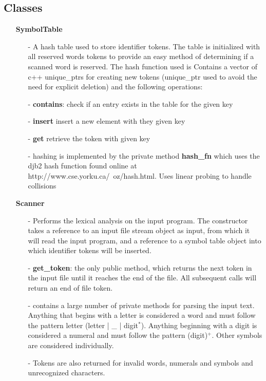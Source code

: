 \documentclass{article}
\begin{document}
\subsection*{Classes}

    \begin{itemize}
        \item[]\textbf{SymbolTable} 
            \begin{itemize}
                \item[-] A hash table used to store identifier tokens. The table is initialized with all reserved words tokens to provide an easy method of determining if a scanned word is reserved. The hash function used is  Contains a vector of c++ unique\_ptrs for creating new tokens (unique\_ptr used to avoid the need for explicit deletion) and the following operations:
                \item[-] \textbf{contains}: check if an entry exists in the table for the given key
                \item[-] \textbf{insert} insert a new element with they given key
                \item[-] \textbf{get} retrieve the token with given key
                \item[-] hashing is implemented by the private method \textbf{hash\_fn} which uses the djb2 hash function found online at http://www.cse.yorku.ca/~oz/hash.html. Uses linear probing to handle collisions
            \end{itemize}

        \item[]\textbf{Scanner}
            \begin{itemize}
                \item[-] Performs the lexical analysis on the input program. The constructor takes a reference to an input file stream object as input, from which it will read the input program, and a reference to a symbol table object into which identifier tokens will be inserted. 
                \item[-] \textbf{get\_token}: the only public method, which returns the next token in the input file until it reaches the end of the file. All subsequent calls will return an end of file token.
                \item[-] contains a large number of private methods for parsing the input text. Anything that begins with a letter is considered a word and must follow the pattern letter (letter | \_ | digit$^*$). Anything beginning with a digit is considered a numeral and must follow the pattern (digit)$^+$. Other symbols are considered individually. 
                \item[-]Tokens are also returned for invalid words, numerals and symbols and unrecognized characters. 
            \end{itemize}


\end{itemize}
\end{document}
